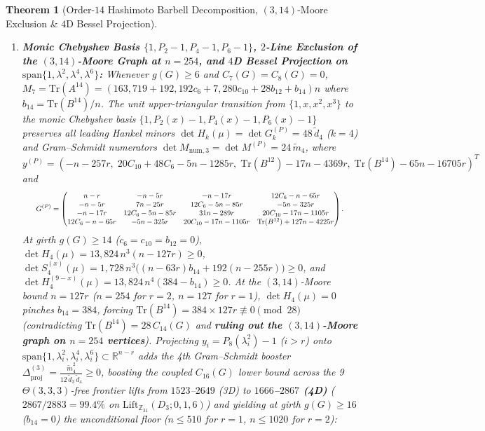\documentclass[10pt,a4paper]{article}
\newtheorem{theorem}{Theorem}[section]
\theoremstyle{definition}
\theoremstyle{remark}
\begin{document}
\begin{theorem}[Order-$14$ Hashimoto Barbell Decomposition, $(3,14)$-Moore Exclusion \& $4$D Bessel Projection]
\begin{enumerate}[label=(\alph*),nosep]
  \item \textbf{Monic Chebyshev Basis $\{1, P_2-1, P_4-1, P_6-1\}$, $2$-Line Exclusion of the $(3,14)$-Moore Graph at $n = 254$, and $4$D Bessel Projection on $\mathrm{span}\{1, \lambda^2, \lambda^4, \lambda^6\}$:}
  Whenever $g(G) \ge 6$ and $C_7(G) = C_8(G) = 0$, $M_7 = \mathrm{Tr}(A^{14}) = (163{,}719 + 192{,}192 c_6 + 7{,}280 c_{10} + 28 b_{12} + b_{14}) n$ where $b_{14} = \mathrm{Tr}(B^{14})/n$. The unit upper-triangular transition from $\{1, x, x^2, x^3\}$ to the monic Chebyshev basis $\{1, P_2(x)-1, P_4(x)-1, P_6(x)-1\}$ preserves all leading Hankel minors $\det H_k(\mu) = \det G_k^{(P)} = 48\,\tilde{d}_4$ ($k=4$) and Gram--Schmidt numerators $\det M_{\mathrm{num},3} = \det M^{(P)} = 24\,\tilde{m}_4$, where $y^{(P)} = (-n - 257r,\; 20 C_{10} + 48 C_6 - 5n - 1285r,\; \mathrm{Tr}(B^{12}) - 17n - 4369r,\; \mathrm{Tr}(B^{14}) - 65n - 16705r)^T$ and
  \begin{equation}\label{eq:gp_matrix}
    \resizebox{0.91\linewidth}{!}{$\displaystyle
    G^{(P)} = \begin{pmatrix}
      n - r & -n - 5r & -n - 17r & 12 C_6 - n - 65r \\
      -n - 5r & 7n - 25r & 12 C_6 - 5n - 85r & -5n - 325r \\
      -n - 17r & 12 C_6 - 5n - 85r & 31n - 289r & 20 C_{10} - 17n - 1105r \\
      12 C_6 - n - 65r & -5n - 325r & 20 C_{10} - 17n - 1105r & \mathrm{Tr}(B^{12}) + 127n - 4225r
    \end{pmatrix}.
    $}
  \end{equation}
  At girth $g(G) \ge 14$ ($c_6 = c_{10} = b_{12} = 0$), $\det H_4(\mu) = 13{,}824\,n^3 (n - 127r) \ge 0$, $\det S_4^{(x)}(\mu) = 1{,}728\,n^3 \bigl((n - 63r) b_{14} + 192(n - 255r)\bigr) \ge 0$, and $\det H_4^{(9-x)}(\mu) = 13{,}824\,n^4 (384 - b_{14}) \ge 0$. At the $(3,14)$-Moore bound $n = 127r$ ($n = 254$ for $r = 2$, $n = 127$ for $r = 1$), $\det H_4(\mu) = 0$ pinches $b_{14} = 384$, forcing $\mathrm{Tr}(B^{14}) = 384 \times 127r \not\equiv 0 \pmod{28}$ (contradicting $\mathrm{Tr}(B^{14}) = 28\,C_{14}(G)$ and \textbf{ruling out the $(3,14)$-Moore graph on $n = 254$ vertices}). Projecting $y_i = P_8(\lambda_i^2) - 1$ ($i > r$) onto $\mathrm{span}\{1, \lambda_i^2, \lambda_i^4, \lambda_i^6\} \subset \mathbb{R}^{n-r}$ adds the 4th Gram--Schmidt booster $\Delta_{\mathrm{proj}}^{(3)} = \frac{\tilde{m}_4^2}{12\,\tilde{d}_3\,\tilde{d}_4} \ge 0$, boosting the coupled $C_{16}(G)$ lower bound across the 9 $\Theta(3,3,3)$-free frontier lifts from $1523$--$2649$ (3D) to \textbf{$1666$--$2867$ (4D)} ($2867/2883 = \mathbf{99.4\%}$ on $\mathrm{Lift}_{\mathbb{Z}_{31}}(D_3; 0, 1, 6)$) and yielding at girth $g(G) \ge 16$ ($b_{14} = 0$) the unconditional floor ($n \le 510$ for $r=1$, $n \le 1020$ for $r=2$):

\end{enumerate}
\end{theorem}
\end{document}
